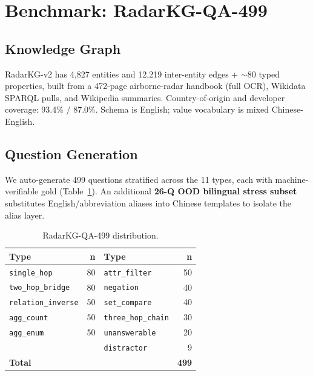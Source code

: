 \documentclass[10pt,a4paper,twocolumn]{article}
\newcommand{\qtype}[1]{\texttt{\small #1}}
\begin{document}
\section{Benchmark: RadarKG-QA-499}
\label{sec:benchmark}

\subsection{Knowledge Graph}
RadarKG-v2 has 4{,}827 entities and 12{,}219 inter-entity edges + ${\sim}80$ typed properties, built from a 472-page airborne-radar handbook (full OCR), Wikidata SPARQL pulls, and Wikipedia summaries. Country-of-origin and developer coverage: 93.4\% / 87.0\%. Schema is English; value vocabulary is mixed Chinese-English.

\subsection{Question Generation}
We auto-generate 499 questions stratified across the 11 types, each with machine-verifiable gold (Table~\ref{tab:qa-dist}). An additional \textbf{26-Q OOD bilingual stress subset} substitutes English/abbreviation aliases into Chinese templates to isolate the alias layer.

\begin{table}[h]
\centering
\small
\caption{RadarKG-QA-499 distribution.}
\label{tab:qa-dist}
\begin{tabular}{l r l r}
\toprule
\textbf{Type} & \textbf{n} & \textbf{Type} & \textbf{n} \\
\midrule
\qtype{single\_hop}        & 80 & \qtype{attr\_filter}      & 50 \\
\qtype{two\_hop\_bridge}   & 80 & \qtype{negation}          & 40 \\
\qtype{relation\_inverse}  & 50 & \qtype{set\_compare}      & 40 \\
\qtype{agg\_count}         & 50 & \qtype{three\_hop\_chain} & 30 \\
\qtype{agg\_enum}          & 50 & \qtype{unanswerable}      & 20 \\
                           &    & \qtype{distractor}        & 9  \\
\midrule
\multicolumn{3}{l}{\textbf{Total}} & \textbf{499} \\
\bottomrule
\end{tabular}
\end{table}
\end{document}
